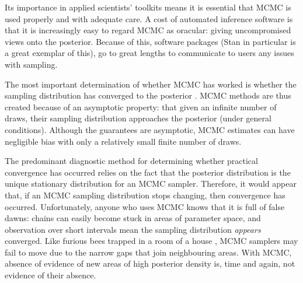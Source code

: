 \documentclass{article}
\begin{document}
Its importance in applied scientists' toolkits means it is essential that MCMC is used properly and with adequate care. A cost of automated inference software is that it is increasingly easy to regard MCMC as oracular: giving uncompromised views onto the posterior. Because of this, software packages (Stan in particular \citep{carpenter2017stan} is a great exemplar of this), go to great lengths to communicate to users any issues with sampling.


The most important determination of whether MCMC has worked is whether the sampling distribution has converged to the posterior \citep{brooks2011handbook}. MCMC methods are thus created because of an asymptotic property: that given an infinite number of draws, their sampling distribution approaches the posterior (under general conditions). Although the guarantees are asymptotic, MCMC estimates can have negligible bias with only a relatively small finite number of draws.

The predominant diagnostic method for determining whether practical convergence has occurred relies on the fact that the posterior distribution is the unique stationary distribution for an MCMC sampler. Therefore, it would appear that, if an MCMC sampling distribution stops changing, then convergence has occurred. Unfortunately, anyone who uses MCMC knows that it is full of false dawns: chains can easily become stuck in areas of parameter space, and observation over short intervals mean the sampling distribution \textit{appears} converged. Like furious bees trapped in a room of a house \citep{lambertbees}, MCMC samplers may fail to move due to the narrow gaps that join neighbouring areas. With MCMC, absence of evidence of new areas of high posterior density is, time and again, not evidence of their absence.
\end{document}
